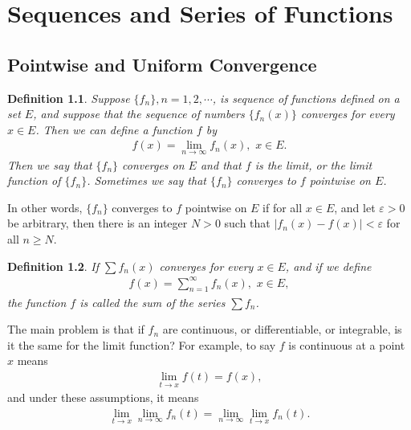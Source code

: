 \documentclass[10pt]{book}
\newtheorem{definition}{Definition}[chapter]
\theoremstyle{definition}
\numberwithin{equation}{chapter}
\begin{document}
\medskip





\chapter{Sequences and Series of Functions}

\section{Pointwise and Uniform Convergence}

\begin{definition}
Suppose $\{f_n\}, n = 1,2,\cdots$, is sequence of functions defined on a set $E$, and suppose that the sequence of numbers $\{f_n(x)\}$ converges for every $x \in E$. Then we can define a function $f$ by
\begin{align*}
    f(x) = \lim_{n\to\infty} f_n(x), \,\, x \in E.
\end{align*}
Then we say that $\{f_n\}$ converges on $E$ and that $f$ is the limit, or the limit function of $\{f_n\}$. Sometimes we say that $\{f_n\}$ converges to $f$ pointwise on $E$.
\end{definition}

\medskip

In other words, $\{f_n\}$ converges to $f$ pointwise on $E$ if for all $x \in E$, and let $\varepsilon > 0$ be arbitrary, then there is an integer $N > 0$ such that $\left|f_n(x) - f(x)\right| < \varepsilon$ for all $n \geq N$.

\medskip

\begin{definition}
If $\sum f_n(x)$ converges for every $x \in E$, and if we define
\begin{align*}
    f(x) = \sum^\infty_{n=1} f_n(x),  \,\, x \in E,
\end{align*}
the function $f$ is called the sum of the series $\sum f_n$.
\end{definition}

\medskip

The main problem is that if $f_n$ are continuous, or differentiable, or integrable, is it the same for the limit function? For example, to say $f$ is continuous at a point $x$ means
\begin{align*}
    \lim_{t\to x} f(t) = f(x),
\end{align*}
and under these assumptions, it means
\begin{align*}
    \lim_{t\to x} \lim_{n\to\infty} f_n(t) = \lim_{n\to\infty} \lim_{t\to x} f_n(t).
\end{align*}
\end{document}
